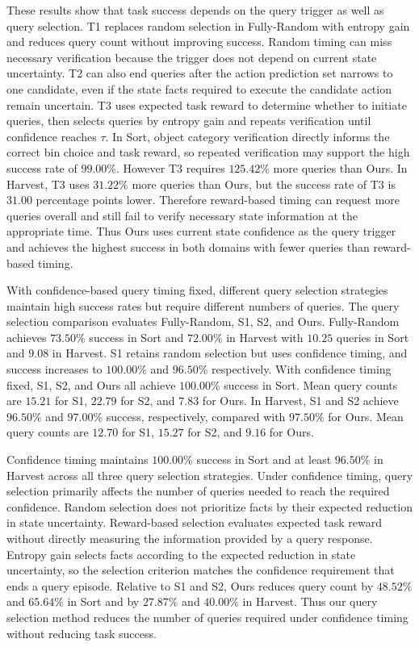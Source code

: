 These results show that task success depends on the query trigger as well as query selection. T1 replaces random selection in Fully-Random with entropy gain and reduces query count without improving success. Random timing can miss necessary verification because the trigger does not depend on current state uncertainty. T2 can also end queries after the action prediction set narrows to one candidate, even if the state facts required to execute the candidate action remain uncertain. T3 uses expected task reward to determine whether to initiate queries, then selects queries by entropy gain and repeats verification until confidence reaches $\tau$. In Sort, object category verification directly informs the correct bin choice and task reward, so repeated verification may support the high success rate of $99.00\%$. However T3 requires $125.42\%$ more queries than Ours. In Harvest, T3 uses $31.22\%$ more queries than Ours, but the success rate of T3 is $31.00$ percentage points lower. Therefore reward-based timing can request more queries overall and still fail to verify necessary state information at the appropriate time. Thus Ours uses current state confidence as the query trigger and achieves the highest success in both domains with fewer queries than reward-based timing.

With confidence-based query timing fixed, different query selection strategies maintain high success rates but require different numbers of queries. The query selection comparison evaluates Fully-Random, S1, S2, and Ours. Fully-Random achieves $73.50\%$ success in Sort and $72.00\%$ in Harvest with $10.25$ queries in Sort and $9.08$ in Harvest. S1 retains random selection but uses confidence timing, and success increases to $100.00\%$ and $96.50\%$ respectively. With confidence timing fixed, S1, S2, and Ours all achieve $100.00\%$ success in Sort. Mean query counts are $15.21$ for S1, $22.79$ for S2, and $7.83$ for Ours. In Harvest, S1 and S2 achieve $96.50\%$ and $97.00\%$ success, respectively, compared with $97.50\%$ for Ours. Mean query counts are $12.70$ for S1, $15.27$ for S2, and $9.16$ for Ours.

Confidence timing maintains $100.00\%$ success in Sort and at least $96.50\%$ in Harvest across all three query selection strategies. Under confidence timing, query selection primarily affects the number of queries needed to reach the required confidence. Random selection does not prioritize facts by their expected reduction in state uncertainty. Reward-based selection evaluates expected task reward without directly measuring the information provided by a query response. Entropy gain selects facts according to the expected reduction in state uncertainty, so the selection criterion matches the confidence requirement that ends a query episode. Relative to S1 and S2, Ours reduces query count by $48.52\%$ and $65.64\%$ in Sort and by $27.87\%$ and $40.00\%$ in Harvest. Thus our query selection method reduces the number of queries required under confidence timing without reducing task success.


